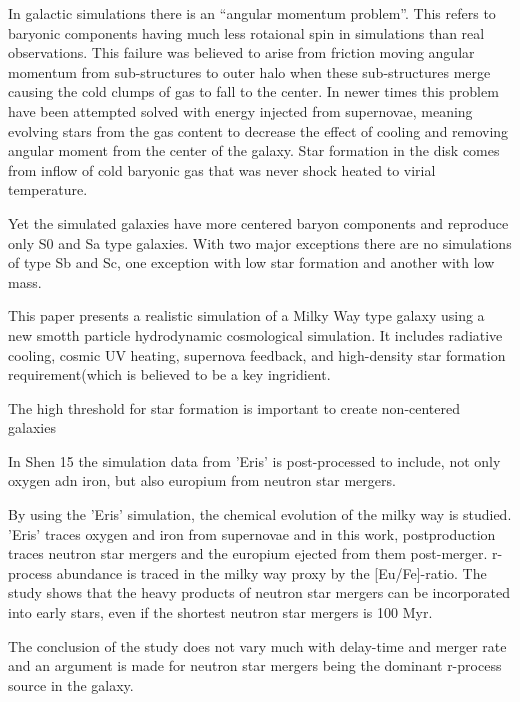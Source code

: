 In galactic simulations there is an ``angular momentum problem''. This refers to baryonic components having much less rotaional spin in simulations than real observations. This failure was believed to arise from friction moving angular momentum from sub-structures to outer halo when these sub-structures merge causing the cold clumps of gas to fall to the center.
In newer times this problem have been attempted solved with energy injected from supernovae, meaning evolving stars from the gas content to decrease the effect of cooling and removing angular moment from the center of the galaxy.
Star formation in the disk comes from inflow of cold baryonic gas that was never shock heated to virial temperature.

Yet the simulated galaxies have more centered baryon components and reproduce only S0 and Sa type galaxies. With two major exceptions there are no simulations of type Sb and Sc, one exception with low star formation and another with low mass.

This paper presents a realistic simulation of a Milky Way type galaxy using a new smotth particle hydrodynamic cosmological simulation. It includes radiative cooling, cosmic UV heating, supernova feedback, and high-density star formation requirement(which is believed to be a key ingridient.

The high threshold for star formation is important to create non-centered galaxies

In Shen 15  the simulation data from 'Eris' is post-processed to include, not only oxygen adn iron, but also europium from neutron star mergers.

By using the 'Eris' simulation\cite{guedes11e}, the chemical evolution of the milky way is studied.
'Eris' traces oxygen and iron from supernovae and in this work, postproduction traces neutron star mergers and the europium ejected from them post-merger.
r-process abundance is traced in the milky way proxy by the [Eu/Fe]-ratio.
The study shows that the heavy products of neutron star mergers can be incorporated into early stars, even if the shortest neutron star mergers is 100 Myr.

The conclusion of the study does not vary much with delay-time and merger rate and an argument is made for neutron star mergers being the dominant r-process source in the galaxy.

